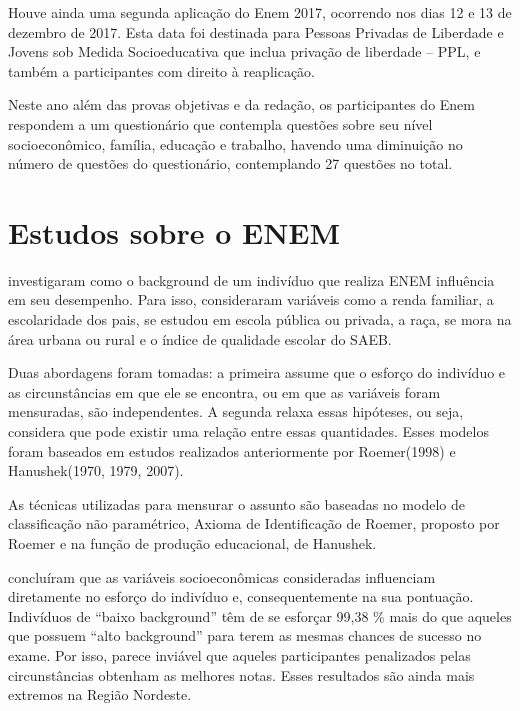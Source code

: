 	Houve ainda uma segunda aplicação do Enem 2017, ocorrendo nos dias 12 e 13 de dezembro de 2017. Esta data foi destinada para Pessoas Privadas de Liberdade e Jovens sob Medida Socioeducativa que inclua privação de liberdade – PPL, e também a participantes com direito à reaplicação.

	Neste ano além das provas objetivas e da redação, os participantes do Enem respondem a um questionário que contempla questões sobre seu nível socioeconômico, família, educação e trabalho, havendo uma diminuição no número de questões do questionário, contemplando 27 questões no total.

	\section{Estudos sobre o ENEM}

	 investigaram como o background de um indivíduo que realiza ENEM influência em seu desempenho. Para isso, consideraram variáveis como a renda familiar, a escolaridade dos pais, se estudou em escola pública ou privada, a raça, se mora na área urbana ou rural e o índice de qualidade escolar do SAEB.

	Duas abordagens foram tomadas: a primeira assume que o esforço do indivíduo e as circunstâncias em que ele se encontra, ou em que as variáveis foram mensuradas, são independentes. A segunda relaxa essas hipóteses, ou seja, considera que pode existir uma relação entre essas quantidades. Esses modelos foram baseados em estudos realizados anteriormente por Roemer(1998) e Hanushek(1970, 1979, 2007).

	As técnicas utilizadas para mensurar o assunto são baseadas no modelo de classificação não paramétrico, Axioma de Identificação de Roemer, proposto por Roemer e na função de produção educacional, de Hanushek.

	 concluíram que as variáveis socioeconômicas consideradas influenciam diretamente no esforço do indivíduo e, consequentemente na sua pontuação. Indivíduos de “baixo background” têm de se esforçar 99,38 \% mais do que aqueles que possuem “alto background” para terem as mesmas chances de sucesso no exame. Por isso, parece inviável que aqueles participantes penalizados pelas circunstâncias obtenham as melhores notas. Esses resultados são ainda mais extremos na Região Nordeste.

